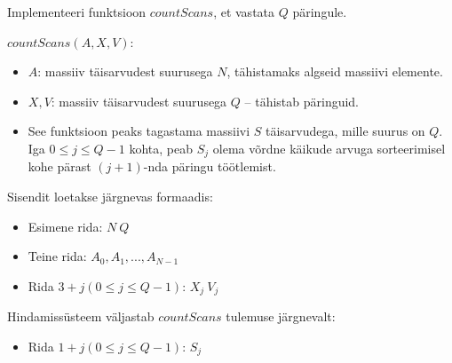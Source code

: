 \documentclass{trkut}
\theoremstyle{definition}
\begin{document}
Implementeeri funktsioon $countScans$, et vastata $Q$ päringule.

$countScans(A,X,V)$:
\begin{itemize}
    \item $A$: massiiv täisarvudest suurusega $N$, tähistamaks algseid massiivi elemente.
    \item $X,V$: massiiv täisarvudest suurusega $Q$ -- tähistab päringuid.
    \item See funktsioon peaks tagastama massiivi $S$ täisarvudega, mille suurus on $Q$. Iga $0\le j\le Q-1$ kohta, peab $S_j$ olema võrdne käikude arvuga sorteerimisel kohe pärast $(j+1)$-nda päringu töötlemist.
\end{itemize}

Sisendit loetakse järgnevas formaadis:
\begin{itemize}
    \item Esimene rida: $N\ Q$
    \item Teine rida: $A_0,A_1,...,A_{N-1}$
    \item Rida $3+j$$(0\le j\le Q-1)$: $X_j\ V_j$
\end{itemize}

Hindamissüsteem väljastab $countScans$ tulemuse järgnevalt:
\begin{itemize}
    \item Rida $1+j$$(0\le j\le Q-1)$: $S_j$
\end{itemize}

\parencite{JOI}
\end{document}
